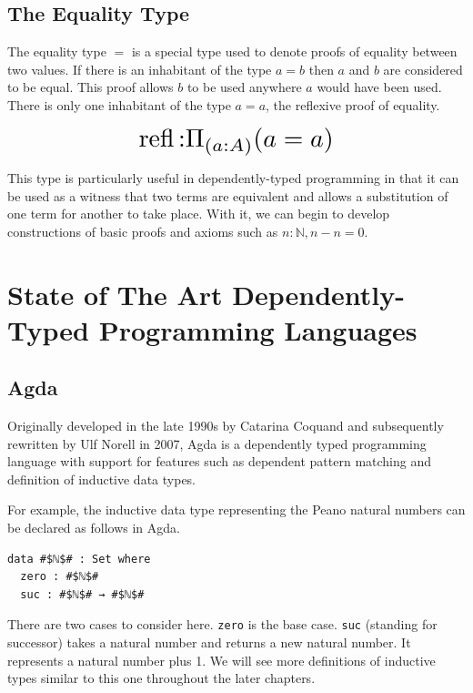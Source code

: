 \documentclass[a4paper, notitlepage]{report}
\begin{document}
\subsection{The Equality Type}
\label{sec:org37eca17}
The equality type \(=\) is a special type used to denote proofs of equality
between two values. If there is an inhabitant of the type \(a \mathrel{=} b\) then
\(a\) and \(b\) are considered to be equal. This proof allows \(b\) to be used
anywhere \(a\) would have been used. There is only one inhabitant of the type \(a
\mathrel{=} a\), the reflexive proof of equality.

\[ \scalebox{2}{$\operatorname{refl} \mathbin{:} \Pi_{(a \mathbin{:} A)} (a
\mathrel{=} a)$} \]

This type is particularly useful in dependently-typed programming in that it can
be used as a witness that two terms are equivalent and allows a substitution of
one term for another to take place. With it, we can begin to develop
constructions of basic proofs and axioms such as \(n \mathbin{:} {\mathbb N}, n
\mathbin{-} n \mathrel{=} 0\).

\section{State of The Art Dependently-Typed Programming Languages}
\label{sec:org53eaf72}
\subsection{Agda}
\label{sec:orgf46d71c}
Originally developed in the late 1990s by Catarina Coquand and subsequently
rewritten by Ulf Norell in 2007, Agda is a dependently typed programming
language with support for features such as dependent pattern matching and
definition of inductive data types.

For example, the inductive data type representing the Peano natural numbers can
be declared as follows in Agda.

\begin{verbatim}
data #$ℕ$# : Set where
  zero : #$ℕ$#
  suc : #$ℕ$# → #$ℕ$#
\end{verbatim}

There are two cases to consider here. \texttt{zero} is the base case. \texttt{suc} (standing
for successor) takes a natural number and returns a new natural number. It
represents a natural number plus 1. We will see more definitions of inductive
types similar to this one throughout the later chapters.
\end{document}
